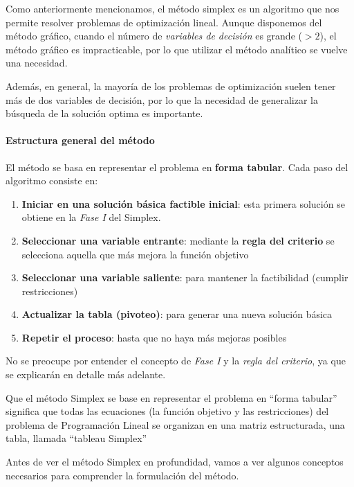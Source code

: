 Como anteriormente mencionamos, el método simplex es un algoritmo que nos permite resolver problemas de optimización lineal. Aunque disponemos del método gráfico, cuando el número de \textit{variables de decisión} es grande (\(> 2\)), el método gráfico es impracticable, por lo que utilizar el método analítico se vuelve una necesidad.

Además, en general, la mayoría de los problemas de optimización suelen tener más de dos variables de decisión, por lo que la necesidad de generalizar la búsqueda de la solución optima es importante.

\paragraph{Estructura general del método}

El método se basa en representar el problema en \textbf{forma tabular}. Cada paso del algoritmo consiste en:
\begin{enumerate}
  \item \textbf{Iniciar en una solución básica factible inicial}: esta primera solución se obtiene en la \textit{Fase I} del Simplex. 
  \item \textbf{Seleccionar una variable entrante}: mediante la \textbf{regla del criterio} se selecciona aquella que más mejora la función objetivo
  \item \textbf{Seleccionar una variable saliente}: para mantener la factibilidad (cumplir restricciones)
  \item \textbf{Actualizar la tabla (pivoteo)}: para generar una nueva solución básica
  \item \textbf{Repetir el proceso}: hasta que no haya más mejoras posibles
\end{enumerate} 
No se preocupe por entender el concepto de \textit{Fase I} y la \textit{regla del criterio}, ya que se explicarán en detalle más adelante.

\begin{tcolorbox}[remember, title=Forma tabular]
  Que el método Simplex se base en representar el problema en ``forma tabular'' significa que todas las ecuaciones (la función objetivo y las restricciones) del problema de Programación Lineal se organizan en una matriz estructurada, una tabla, llamada ``tableau Simplex''
\end{tcolorbox}

Antes de ver el método Simplex en profundidad, vamos a ver algunos conceptos necesarios para comprender la formulación del método.

